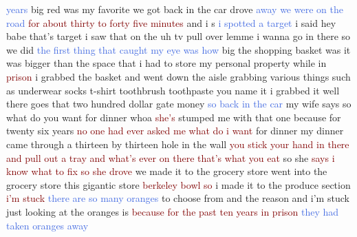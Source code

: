 \textcolor{RoyalBlue}{years} big red was my favorite we got back in the car drove \textcolor{RoyalBlue}{away} \textcolor{RoyalBlue}{we} \textcolor{RoyalBlue}{were} \textcolor{RoyalBlue}{on} \textcolor{RoyalBlue}{the} \textcolor{RoyalBlue}{road} \textcolor{Maroon}{for} \textcolor{Maroon}{about} \textcolor{Maroon}{thirty} \textcolor{Maroon}{to} \textcolor{Maroon}{forty} \textcolor{Maroon}{five} \textcolor{Maroon}{minutes} and i s \textcolor{RoyalBlue}{i} \textcolor{RoyalBlue}{spotted} \textcolor{RoyalBlue}{a} \textcolor{RoyalBlue}{target} i said hey babe that's target i saw that on the uh tv pull over lemme i wanna go in there so we did \textcolor{RoyalBlue}{the} \textcolor{RoyalBlue}{first} \textcolor{RoyalBlue}{thing} \textcolor{RoyalBlue}{that} \textcolor{RoyalBlue}{caught} \textcolor{RoyalBlue}{my} \textcolor{RoyalBlue}{eye} \textcolor{RoyalBlue}{was} \textcolor{RoyalBlue}{how} big the shopping basket was it was bigger than the space that i had to store my personal property while in \textcolor{Maroon}{prison} i grabbed the basket and went down the aisle grabbing various things such as underwear socks t-shirt toothbrush toothpaste you name it i grabbed it well there goes that two hundred dollar gate money \textcolor{RoyalBlue}{so} \textcolor{RoyalBlue}{back} \textcolor{RoyalBlue}{in} \textcolor{RoyalBlue}{the} \textcolor{RoyalBlue}{car} my wife says so what do you want for dinner whoa \textcolor{Maroon}{she's} stumped me with that one because for twenty six years \textcolor{Maroon}{no} \textcolor{Maroon}{one} \textcolor{Maroon}{had} \textcolor{Maroon}{ever} \textcolor{Maroon}{asked} \textcolor{Maroon}{me} \textcolor{Maroon}{what} \textcolor{Maroon}{do} \textcolor{Maroon}{i} \textcolor{Maroon}{want} for dinner my dinner came through a thirteen by thirteen hole in the wall \textcolor{Maroon}{you} \textcolor{Maroon}{stick} \textcolor{Maroon}{your} \textcolor{Maroon}{hand} \textcolor{Maroon}{in} \textcolor{Maroon}{there} \textcolor{Maroon}{and} \textcolor{Maroon}{pull} \textcolor{Maroon}{out} \textcolor{Maroon}{a} \textcolor{Maroon}{tray} \textcolor{Maroon}{and} \textcolor{Maroon}{what's} \textcolor{Maroon}{ever} \textcolor{Maroon}{on} \textcolor{Maroon}{there} \textcolor{Maroon}{that's} \textcolor{Maroon}{what} \textcolor{Maroon}{you} \textcolor{Maroon}{eat} so she \textcolor{Maroon}{says} \textcolor{Maroon}{i} \textcolor{Maroon}{know} \textcolor{Maroon}{what} \textcolor{Maroon}{to} \textcolor{Maroon}{fix} \textcolor{Maroon}{so} \textcolor{Maroon}{she} \textcolor{Maroon}{drove} we made it to the grocery store went into the grocery store this gigantic store \textcolor{Maroon}{berkeley} \textcolor{Maroon}{bowl} \textcolor{Maroon}{so} i made it to the produce section \textcolor{Maroon}{i'm} \textcolor{Maroon}{stuck} \textcolor{RoyalBlue}{there} \textcolor{RoyalBlue}{are} \textcolor{RoyalBlue}{so} \textcolor{RoyalBlue}{many} \textcolor{RoyalBlue}{oranges} to choose from and the reason and i'm stuck just looking at the oranges is \textcolor{Maroon}{because} \textcolor{Maroon}{for} \textcolor{Maroon}{the} \textcolor{Maroon}{past} \textcolor{Maroon}{ten} \textcolor{Maroon}{years} \textcolor{Maroon}{in} \textcolor{Maroon}{prison} \textcolor{RoyalBlue}{they} \textcolor{RoyalBlue}{had} \textcolor{RoyalBlue}{taken} \textcolor{RoyalBlue}{oranges} \textcolor{RoyalBlue}{away} 